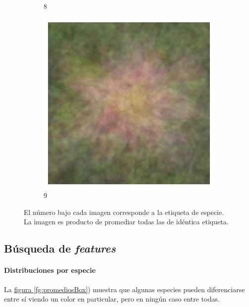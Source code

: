 \documentclass{article}
\begin{document}
\begin{figure}
\begin{subfigure}[b]{0.09\textwidth}
		\caption{8}
	\end{subfigure}
	\begin{subfigure}[b]{0.09\textwidth}
		\includegraphics[width= \textwidth]{ave9}
		\caption{9}
	\end{subfigure}
	\caption{El número bajo cada imagen corresponde a la etiqueta de especie. La imagen es producto de promediar todas las de idéntica etiqueta.}
	\label{fg:promedios}
\end{figure}



\subsection{Búsqueda de \emph{features}}

\paragraph{Distribuciones por especie} La \hyperref[fg:promediosBox]{figura \ref*{fg:promediosBox}}) muestra que algunas especies pueden diferenciarse entre sí viendo un color en particular, pero en ningún caso entre todas.
\end{document}
